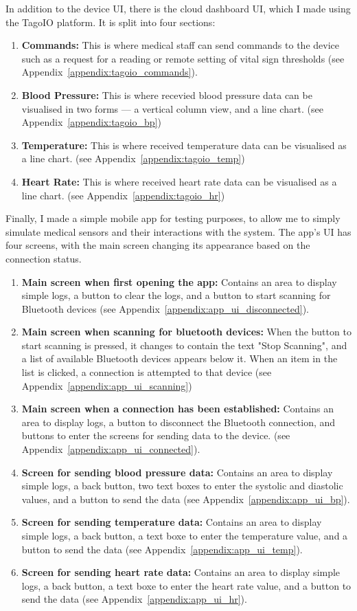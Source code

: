 In addition to the device UI, there is the cloud dashboard UI, which I made using the TagoIO platform. It is split into four sections:
\begin{enumerate}
	\item \textbf{Commands:} This is where medical staff can send commands to the device such as a request for a reading or remote setting of vital sign thresholds (see Appendix~\ref{appendix:tagoio_commands}).
	\item \textbf{Blood Pressure:} This is where recevied blood pressure data can be visualised in two forms --- a vertical column view, and a line chart. (see Appendix~\ref{appendix:tagoio_bp})
	\item \textbf{Temperature:} This is where received temperature data can be visualised as a line chart. (see Appendix~\ref{appendix:tagoio_temp})
	\item \textbf{Heart Rate:} This is where received heart rate data can be visualised as a line chart. (see Appendix~\ref{appendix:tagoio_hr})
\end{enumerate}

Finally, I made a simple mobile app for testing purposes, to allow me to simply simulate medical sensors and their interactions with the system. The app's UI has four screens, with the main screen changing its appearance based on the connection status.
\begin{enumerate}
	\item \textbf{Main screen when first opening the app:} Contains an area to display simple logs, a button to clear the logs, and a button to start scanning for Bluetooth devices (see Appendix~\ref{appendix:app_ui_disconnected}).
	\item \textbf{Main screen when scanning for bluetooth devices:} When the button to start scanning is pressed, it changes to contain the text "Stop Scanning", and a list of available Bluetooth devices appears below it. When an item in the list is clicked, a connection is attempted to that device (see Appendix~\ref{appendix:app_ui_scanning})
	\item \textbf{Main screen when a connection has been established:} Contains an area to display logs, a button to disconnect the Bluetooth connection, and buttons to enter the screens for sending data to the device. (see Appendix~\ref{appendix:app_ui_connected}).
	\item \textbf{Screen for sending blood pressure data:} Contains an area to display simple logs, a back button, two text boxes to enter the systolic and diastolic values, and a button to send the data (see Appendix~\ref{appendix:app_ui_bp}).
	\item \textbf{Screen for sending temperature data:} Contains an area to display simple logs, a back button, a text boxe to enter the temperature value, and a button to send the data (see Appendix~\ref{appendix:app_ui_temp}).
	\item \textbf{Screen for sending heart rate data:} Contains an area to display simple logs, a back button, a text boxe to enter the heart rate value, and a button to send the data (see Appendix~\ref{appendix:app_ui_hr}).
\end{enumerate}

